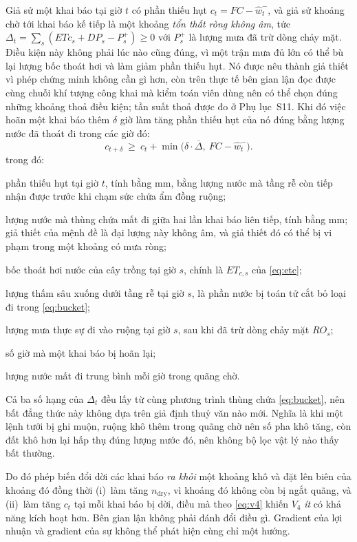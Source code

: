 \begin{proposition}
\label{prop:coincide}
Giả sử một khai báo tại giờ $t$ có phần thiếu hụt $c_t=FC-\hat w_t^{-}$, và giả sử
khoảng chờ tới khai báo kế tiếp là một khoảng \emph{tổn thất ròng không âm}, tức
$\Delta_t=\sum_{s}(\mathit{ETc}_s+\mathit{DP}_s-P_s^{+})\ge 0$ với $P_s^{+}$ là lượng
mưa đã trừ dòng chảy mặt. Điều kiện này không phải lúc nào cũng đúng, vì một trận
mưa đủ lớn có thể bù lại lượng bốc thoát hơi và làm giảm phần thiếu hụt. Nó được
nêu thành giả thiết vì phép chứng minh không cần gì hơn, còn trên thực tế bên gian
lận đọc được cùng chuỗi khí tượng công khai mà kiểm toán viên dùng nên có thể chọn
đúng những khoảng thoả điều kiện; tần suất thoả được đo ở Phụ lục~S11. Khi đó việc
hoãn một khai báo thêm $\delta$ giờ làm tăng phần thiếu hụt của nó đúng bằng lượng
nước đã thoát đi trong các giờ đó:
\begin{equation}
c_{t+\delta}\ \ge\ c_t+\min\!\bigl(\delta\cdot\overline{\Delta},\ FC-\hat w_t^{-}\bigr).
\label{eq:delay}
\end{equation}
trong đó:
\begin{symbolist}
\item[$c_t$] phần thiếu hụt tại giờ $t$, tính bằng mm, bằng lượng nước mà tầng rễ
  còn tiếp nhận được trước khi chạm sức chứa ẩm đồng ruộng;
\item[$\Delta_t$] lượng nước mà thùng chứa mất đi giữa hai lần khai báo liên tiếp,
  tính bằng mm; giả thiết của mệnh đề là đại lượng này không âm, và giả thiết đó có
  thể bị vi phạm trong một khoảng có mưa ròng;
\item[$\mathit{ETc}_s$] bốc thoát hơi nước của cây trồng tại giờ $s$, chính là
  $ET_{c,s}$ của \eqref{eq:etc};
\item[$\mathit{DP}_s$] lượng thấm sâu xuống dưới tầng rễ tại giờ $s$, là phần
  nước bị toán tử cắt bỏ loại đi trong \eqref{eq:bucket};
\item[$P_s^{+}$] lượng mưa thực sự đi vào ruộng tại giờ $s$, sau khi đã trừ dòng
  chảy mặt $RO_s$;
\item[$\delta$] số giờ mà một khai báo bị hoãn lại;
\item[$\overline{\Delta}$] lượng nước mất đi trung bình mỗi giờ trong quãng chờ.
\end{symbolist}

Cả ba số hạng của $\Delta_t$ đều lấy từ cùng phương trình thùng chứa
\eqref{eq:bucket}, nên bất đẳng thức này không dựa trên giả định thuỷ văn nào mới.
Nghĩa là khi một lệnh tưới bị ghi muộn, ruộng khô thêm trong quãng chờ nên số pha
khô tăng, còn đất khô hơn lại hấp thụ đúng lượng nước đó, nên không bộ lọc vật lý
nào thấy bất thường.

Do đó phép biến đổi dời các khai báo \emph{ra khỏi} một khoảng khô và đặt lên
biên của khoảng đó đồng thời (i)~làm tăng $n_{\mathrm{dry}}$, vì khoảng đó
không còn bị ngắt quãng, và (ii)~làm tăng $c_t$ tại mỗi khai báo bị dời, điều
mà theo \eqref{eq:v4} khiến $V_4$ \emph{ít} có khả năng kích hoạt hơn. Bên gian lận không phải đánh đổi điều gì. Gradient của lợi nhuận và gradient của sự
không thể phát hiện cùng chỉ một hướng.
\end{proposition}

